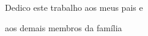 \begin{dedicatoria}
  Dedico este trabalho aos meus pais e
  
  aos demais membros da família
\end{dedicatoria}